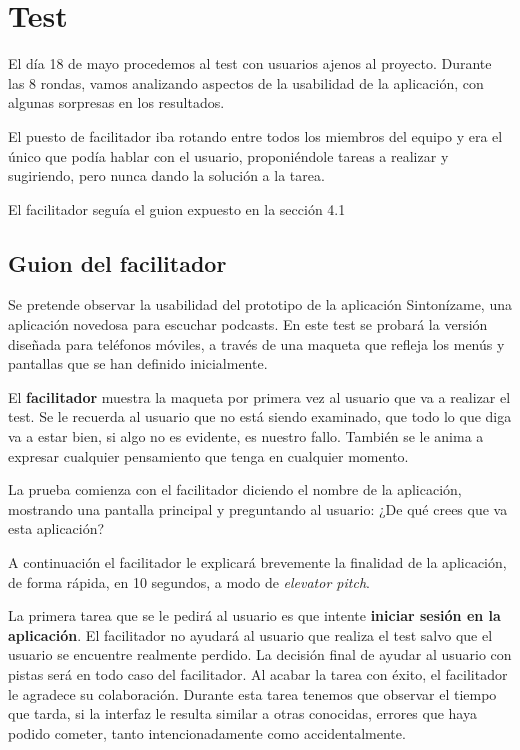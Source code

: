 \documentclass[a4paper]{article}
\begin{document}
\section{Test}

El día 18 de mayo procedemos al test con usuarios ajenos al proyecto. Durante las 8 rondas, vamos analizando aspectos de la usabilidad de la aplicación, con algunas sorpresas en los resultados. 

El puesto de facilitador iba rotando entre todos los miembros del equipo y era el único que podía hablar con el usuario, proponiéndole tareas a realizar y sugiriendo, pero nunca dando la solución a la tarea.

El facilitador seguía el guion expuesto en la sección 4.1

\subsection{Guion del facilitador}

Se pretende observar la usabilidad del prototipo de la aplicación Sintonízame, una aplicación novedosa para escuchar podcasts. En este test se probará la versión diseñada para teléfonos móviles, a través de una maqueta que refleja los menús y pantallas que se han definido inicialmente.

El \textbf{facilitador} muestra la maqueta por primera vez al usuario que va a realizar el test. Se le recuerda al usuario que no está siendo examinado, que todo lo que diga va a estar bien, si algo no es evidente, es nuestro fallo. También se le anima a expresar cualquier pensamiento que tenga en cualquier momento. 

La prueba comienza con el facilitador diciendo el nombre de la aplicación, mostrando una pantalla principal y preguntando al usuario: ¿De qué crees que va esta aplicación? 

A continuación el facilitador le explicará brevemente la finalidad de la aplicación, de forma rápida, en 10 segundos, a modo de \textit{elevator pitch}. 

La primera tarea que se le pedirá al usuario es que intente \textbf{iniciar sesión en la aplicación}. El facilitador no ayudará al usuario que realiza el test salvo que el usuario se encuentre realmente perdido. La decisión final de ayudar al usuario con pistas será en todo caso del facilitador. Al acabar la tarea con éxito, el facilitador le agradece su colaboración. Durante esta tarea tenemos que observar el tiempo que tarda, si la interfaz le resulta similar a otras conocidas, errores que haya podido cometer, tanto intencionadamente como accidentalmente.
\end{document}

